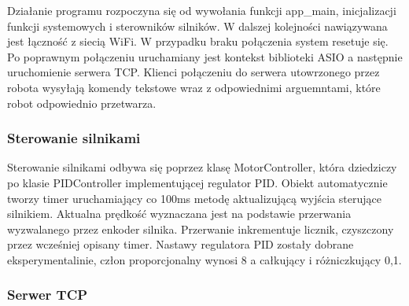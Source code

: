 Działanie programu rozpoczyna się od wywołania funkcji app\_main, inicjalizacji funkcji systemowych i sterowników silników.
W dalszej kolejności nawiązywana jest łączność z siecią WiFi. W przypadku braku połączenia system resetuje się. 
Po poprawnym połączeniu uruchamiany jest kontekst biblioteki ASIO a następnie uruchomienie serwera TCP.
Klienci połączeniu do serwera utowrzonego przez robota wysyłają komendy tekstowe wraz z odpowiednimi arguemntami, które
robot odpowiednio przetwarza. 
\subsubsection{Sterowanie silnikami}
Sterowanie silnikami odbywa się poprzez klasę MotorController, która dziedziczy po klasie PIDController implementującej regulator PID.
Obiekt automatycznie tworzy timer uruchamiający co 100ms metodę aktualizującą wyjścia sterujące silnikiem. 
Aktualna prędkość wyznaczana jest na podstawie przerwania wyzwalanego przez enkoder silnika. Przerwanie inkrementuje licznik, 
czyszczony przez wcześniej opisany timer. Nastawy regulatora PID zostały dobrane eksperymentalinie, człon proporcjonalny wynosi 8 a całkujący i różniczkujący 0,1. 


\subsubsection{Serwer TCP}

